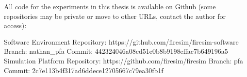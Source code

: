 All code for the experiments in this thesis is available on Github (some
repositories may be private or move to other URLs, contact the author for
access):

\begin{outline}
  \1 Software Environment
    \2 Repository: https://github.com/firesim/firesim-software
    \2 Branch: nathan\_pfa
    \2 Commit: 442324046a08cd51e0b8b9198effac7b649196a5 
  \1 Simulation Platform
    \2 Repository: https://github.com/firesim/firesim
    \2 Branch: pfa
    \2 Commit: 2c7e113b4f317ad6ddece12705667c79ea30fb1f
\end{outline}
  
